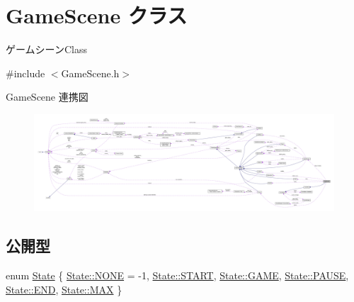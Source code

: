 \hypertarget{class_game_scene}{}\section{Game\+Scene クラス}
\label{class_game_scene}


ゲームシーン\+Class  




{\ttfamily \#include $<$Game\+Scene.\+h$>$}



Game\+Scene 連携図\nopagebreak
\begin{figure}[H]
\begin{center}
\leavevmode
\includegraphics[width=350pt]{class_game_scene__coll__graph}
\end{center}
\end{figure}
\subsection*{公開型}
\begin{DoxyCompactItemize}
\item 
enum \mbox{\hyperlink{class_game_scene_a36a51763487e2f01ced6dd8eb2dd463f}{State}} \{ \newline
\mbox{\hyperlink{class_game_scene_a36a51763487e2f01ced6dd8eb2dd463fab50339a10e1de285ac99d4c3990b8693}{State\+::\+N\+O\+NE}} = -\/1, 
\mbox{\hyperlink{class_game_scene_a36a51763487e2f01ced6dd8eb2dd463fab078ffd28db767c502ac367053f6e0ac}{State\+::\+S\+T\+A\+RT}}, 
\mbox{\hyperlink{class_game_scene_a36a51763487e2f01ced6dd8eb2dd463fa4504e1ed59cd9732b8a844e5424e6f13}{State\+::\+G\+A\+ME}}, 
\mbox{\hyperlink{class_game_scene_a36a51763487e2f01ced6dd8eb2dd463fa291554596c183e837f0a6bec3767c891}{State\+::\+P\+A\+U\+SE}}, 
\newline
\mbox{\hyperlink{class_game_scene_a36a51763487e2f01ced6dd8eb2dd463fab1a326c06d88bf042f73d70f50197905}{State\+::\+E\+ND}}, 
\mbox{\hyperlink{class_game_scene_a36a51763487e2f01ced6dd8eb2dd463fa26a4b44a837bf97b972628509912b4a5}{State\+::\+M\+AX}}
 \}
\end{DoxyCompactItemize}
